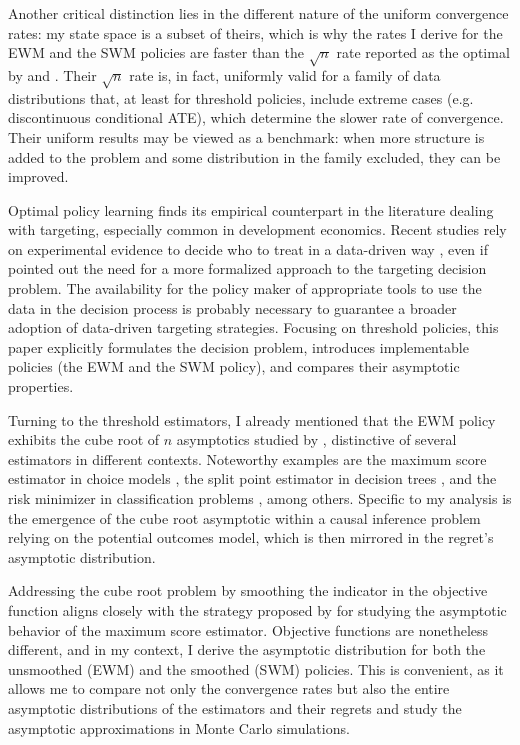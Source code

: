 {Another critical distinction lies in the different nature of the uniform convergence rates: my state space is a subset of theirs, which is why the rates I derive for the EWM and the SWM policies are faster than the $\sqrt{n}$ rate reported as the optimal by \cite{kitagawa2018should} and \cite{athey2021policy}. Their $\sqrt{n}$ rate is, in fact, uniformly valid for a family of data distributions that, at least for threshold policies, include extreme cases (e.g. discontinuous conditional ATE), which determine the slower rate of convergence. Their uniform results may be viewed as a benchmark: when more structure is added to the problem and some distribution in the family excluded, they can be improved.

Optimal policy learning finds its empirical counterpart in the literature dealing with targeting, especially common in development economics. Recent studies rely on experimental evidence to decide who to treat in a data-driven way \citep{hussam2022targeting,aiken2022machine}, even if \cite{haushofer2022targeting} pointed out the need for a more formalized approach to the targeting decision problem. The availability for the policy maker of appropriate tools to use the data in the decision process is probably necessary to guarantee a broader adoption of data-driven targeting strategies. Focusing on threshold policies, this paper explicitly formulates the decision problem, introduces implementable policies (the EWM and the SWM policy), and compares their asymptotic properties.

Turning to the threshold estimators, I already mentioned that the EWM policy exhibits the cube root of $n$ asymptotics studied by \cite{kim1990cube}, distinctive of several estimators in different contexts. Noteworthy examples are the maximum score estimator in choice models \citep{manski1975maximum}, the split point estimator in decision trees \citep{banerjee2007confidence}, and the risk minimizer in classification problems \citep{mohammadi2005asymptotics}, among others. Specific to my analysis is the emergence of the cube root asymptotic within a causal inference problem relying on the potential outcomes model, which is then mirrored in the regret's asymptotic distribution.

Addressing the cube root problem by smoothing the indicator in the objective function aligns closely with the strategy proposed by \cite{horowitz1992smoothed} for studying the asymptotic behavior of the maximum score estimator. Objective functions are nonetheless different, and in my context, I derive the asymptotic distribution for both the unsmoothed (EWM) and the smoothed (SWM) policies. This is convenient, as it allows me to compare not only the convergence rates but also the entire asymptotic distributions of the estimators and their regrets and study the asymptotic approximations in Monte Carlo simulations.

}
